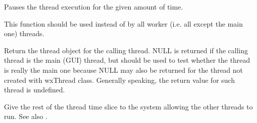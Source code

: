 \label{wxthreadsleep}


Pauses the thread execution for the given amount of time.

This function should be used instead of  by all worker
(i.e. all except the main one) threads.

\label{wxthreadthis}


Return the thread object for the calling thread. NULL is returned if the calling thread
is the main (GUI) thread, but  should be used to test
whether the thread is really the main one because NULL may also be returned for the thread
not created with wxThread class. Generally speaking, the return value for such thread
is undefined.

\label{wxthreadyield}


Give the rest of the thread time slice to the system allowing the other threads to run.
See also .


